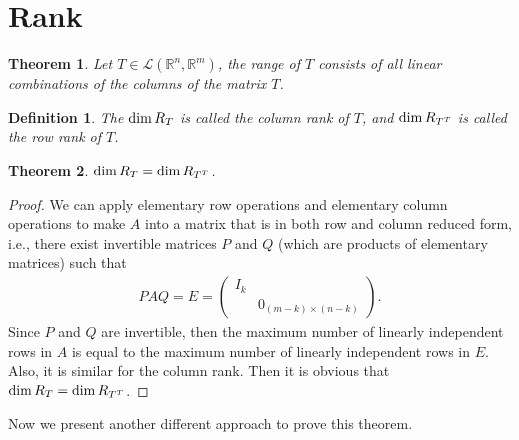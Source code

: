 \documentclass[10pt]{book}
\newtheorem{definition}{Definition}[chapter]
\newtheorem{theorem}{Theorem}[chapter]
\theoremstyle{definition}
\numberwithin{equation}{chapter}
\begin{document}
\medskip

\section{Rank}
\begin{theorem}
Let $T\in\mathscr{L}(\mathbb{R}^n,\mathbb{R}^m)$, the range of $T$ consists of all linear combinations of the columns of the matrix $T$.
\end{theorem}

\medskip

\begin{definition}
The ${\rm dim}\, R_T$ is called the column rank of $T$, and ${\rm dim}\, R_{T^T}$ is called the row rank of $T$.
\end{definition}

\begin{theorem}
${\rm dim}\,R_T = {\rm dim}\, R_{T^T}$.
\end{theorem}
\begin{proof}
We can apply elementary row operations and elementary column operations to make $A$ into a matrix that is in both row and column reduced form, i.e., there exist invertible matrices $P$ and $Q$ (which are products of elementary matrices) such that
\begin{align*}
    PAQ = E = \left(
        \begin{matrix}
        I_{k} &  \\
         & 0_{(m-k)\times (n-k)}
        \end{matrix}
    \right).
\end{align*}
Since $P$ and $Q$ are invertible, then the maximum number of linearly independent rows in $A$ is equal to the maximum number of linearly independent rows in $E$. Also, it is similar for the column rank. Then it is obvious that ${\rm dim}\,R_T = {\rm dim}\, R_{T^T}$.
\end{proof}

Now we present another different approach to prove this theorem.
\end{document}
